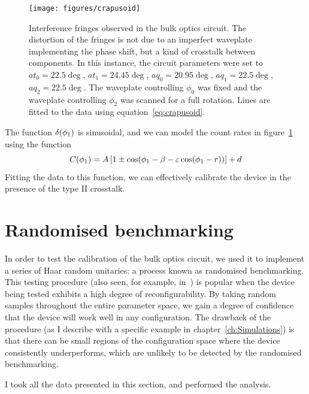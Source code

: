 \begin{figure}[h]
  \centering
  \texttt{[image: figures/crapusoid]}
  \caption[Interference fringes distorted by crosstalk between components]
  {Interference fringes observed in the bulk optics circuit. The distortion of
  the fringes is not due to an imperfect waveplate implementing the phase shift,
  but a kind of crosstalk between components. In this instance, the circuit
  parameters were set to \(at_{0}=22.5\deg\), \(at_{1}=24.45\deg\),
  \(aq_{0}=20.95\deg\), \(aq_{1}=22.5\deg\), \(aq_{2}=22.5\deg\). The waveplate
  controlling \(\phi_{0}\) was fixed and the waveplate controlling \(\phi_{2}\)
  was scanned for a full rotation. Lines are fitted to the data using
  equation~\ref{eq:crapusoid}.}
  \label{fig:crapusoid}
\end{figure}

The function \(\delta \!\left(\phi_{1}\right)\) is sinusoidal, and we can model the
count rates in figure~\ref{fig:crapusoid} using the function
\begin{equation}
  \label{eq:crapusoid}
  C \!\left(\phi_{1}\right) = A \left[ 1 \pm \cos \!\left( \phi_{1} - \beta - \varepsilon
  \cos \!\left( \phi_{1} - r\right)\right) \right] + d
\end{equation}
Fitting the data to this function, we can effectively calibrate the device in
the presence of the type II crosstalk. 

\section{Randomised benchmarking}
\label{sec:Benchmarking}
In order to test the calibration of the bulk optics circuit, we used it to
implement a series of Haar random unitaries: a process known as randomised
benchmarking. This testing procedure (also seen, for example,
in~\cite{peteschip}) is popular when the device being tested exhibits a high
degree of reconfigurability. By taking random samples throughout the entire
parameter space, we gain a degree of confidence that the device will work well
in any configuration. The drawback of the procedure (as I describe with a
specific example in chapter~\ref{ch:Simulations}) is that there can be small
regions of the configuration space where the device consistently
underperforms, which are unlikely to be detected by the randomised benchmarking.

I took all the data presented in this section, and performed the analysis.

